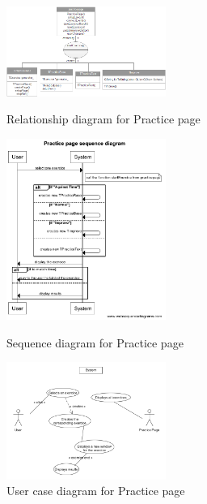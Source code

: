 \begin{figure}[h]
	\centering 
	\begin{minipage}[b]{0.3\textwidth}
      \includegraphics[width=5.2cm]{diagrams/Rpracticepage.png}
      \caption{Relationship diagram for Practice page}   
	\end{minipage}
	\begin{minipage}[b]{0.3\textwidth}
      \includegraphics[width=5.2cm]{diagrams/Spracticepage.png}
      \caption{Sequence diagram for Practice page}
	\end{minipage}
	\begin{minipage}[b]{0.3\textwidth}
      \includegraphics[width=5.2cm]{diagrams/UCpracticepage.png}
      \caption{User case diagram for Practice page}
	\end{minipage}
\end{figure}

